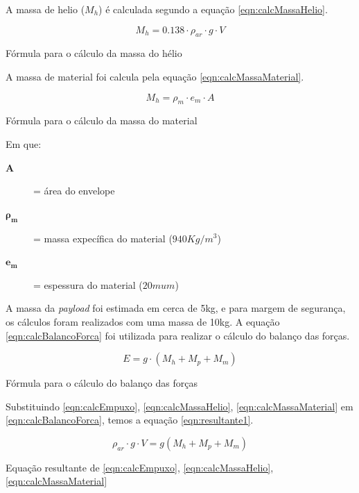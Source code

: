 	A massa de helio ($M_{h}$) é calculada segundo a equação \eqref{eqn:calcMassaHelio}.

	\begin{equacao}
		\begin{equation}
			M_{h} = 0.138 \cdot \rho_{ar} \cdot g \cdot V
		\end{equation}
		\caption{Fórmula para o cálculo da massa do hélio}
		\label{eqn:calcMassaHelio}
	\end{equacao}

	A massa de material foi calcula pela equação \eqref{eqn:calcMassaMaterial}.

	\begin{equacao}
		\begin{equation}
			M_{h} = \rho_{m} \cdot e_{m} \cdot A
		\end{equation}
		\caption{Fórmula para o cálculo da massa do material}
		\label{eqn:calcMassaMaterial}
	\end{equacao}

	Em que:
	\begin{description}
		\item[$\boldsymbol{A}$] = área do envelope
		\item[$\boldsymbol{\rho_{m}}$] = massa expecífica do material ($940Kg/m^3$)
		\item[$\boldsymbol{e_{m}}$] = espessura do material ($20mu m$)
	\end{description}

	A massa da \emph{payload} foi estimada em cerca de 5kg, e para margem de segurança, os cálculos foram realizados com uma massa de 10kg. A equação \eqref{eqn:calcBalancoForca} foi utilizada para realizar o cálculo do balanço das forças.

	\begin{equacao}
		\begin{equation}
			E = g \cdot (M_{h} + M_{p} + M_{m})
		\end{equation}
		\caption{Fórmula para o cálculo do balanço das forças}
		\label{eqn:calcBalancoForca}
	\end{equacao}

	Substituindo \eqref{eqn:calcEmpuxo}, \eqref{eqn:calcMassaHelio}, \eqref{eqn:calcMassaMaterial} em \eqref{eqn:calcBalancoForca}, temos a equação \eqref{eqn:resultante1}.

	\begin{equacao}
		\begin{equation}
			\rho_{ar} \cdot g \cdot V = g(M_{h} + M_{p} + M_{m})
		\end{equation}
		\caption{Equação resultante de \eqref{eqn:calcEmpuxo}, \eqref{eqn:calcMassaHelio}, \eqref{eqn:calcMassaMaterial}}
		\label{eqn:eqResultante1}
	\end{equacao}

